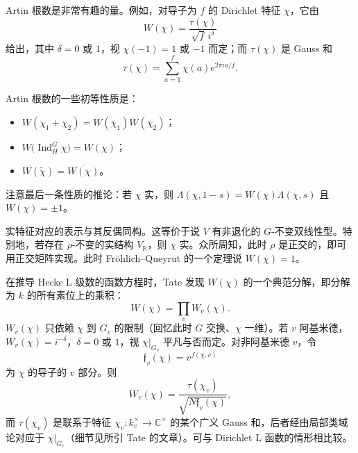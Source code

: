 Artin 根数是非常有趣的量。例如，对导子为 $f$ 的 Dirichlet 特征 $\chi$，它由
\begin{equation}\tag{6.1}\label{c4:eq:6.1}
W(\chi)=\frac{\tau(\chi)}{\sqrt{f}\,i^{\delta}}
\end{equation}
给出，其中 $\delta=0$ 或 $1$，视 $\chi(-1)=1$ 或 $-1$ 而定；而 $\tau(\chi)$ 是 Gauss 和
\begin{equation}\tag{6.2}\label{c4:eq:6.2}
\tau(\chi)=\sum_{a=1}^{f}\chi(a)e^{2\pi ia/f}.
\end{equation}

Artin 根数的一些初等性质是：
\begin{itemize}[leftmargin=2.2em,itemsep=0.2em]
\item $W(\chi_1+\chi_2)=W(\chi_1)W(\chi_2)$；
\item $W\bigl(\operatorname{Ind}^{G}_{H}\chi\bigr)=W(\chi)$；
\item $W(\tilde\chi)=\overline{W(\chi)}$。
\end{itemize}

注意最后一条性质的推论：若 $\chi$ 实，则 $\Lambda(\chi,1-s)=W(\chi)\Lambda(\chi,s)$ 且 $W(\chi)=\pm1$。

实特征对应的表示与其反偶同构。这等价于说 $V$ 有非退化的 $G$-不变双线性型。特别地，若存在 $\rho$-不变的实结构 $V_{\mathbb{R}}$，则 $\chi$ 实。众所周知，此时 $\rho$ 是正交的，即可用正交矩阵实现。此时 Fr\"ohlich--Queyrut 的一个定理说 $W(\chi)=1$。

在推导 Hecke L 级数的函数方程时，Tate 发现 $W(\chi)$ 的一个典范分解，即分解为 $k$ 的所有素位上的乘积：
\begin{equation}\tag{6.3}\label{c4:eq:6.3}
W(\chi)=\prod_{v}W_v(\chi).
\end{equation}
$W_v(\chi)$ 只依赖 $\chi$ 到 $G_v$ 的限制（回忆此时 $G$ 交换、$\chi$ 一维）。若 $v$ 阿基米德，$W_v(\chi)=i^{-\delta}$，$\delta=0$ 或 $1$，视 $\chi|_{G_v}$ 平凡与否而定。对非阿基米德 $v$，令
\begin{equation}\tag{6.4}\label{c4:eq:6.4}
\mathfrak{f}_v(\chi)=v^{f(\chi,v)}
\end{equation}
为 $\chi$ 的导子的 $v$ 部分。则
\begin{equation}\tag{6.5}\label{c4:eq:6.5}
W_v(\chi)=\frac{\tau(\chi_v)}{\sqrt{N\mathfrak{f}_v(\chi)}},
\end{equation}
而 $\tau(\chi_v)$ 是联系于特征 $\chi_v\colon k_v^{\times}\to\mathbb{C}^{\times}$ 的某个广义 Gauss 和，后者经由局部类域论对应于 $\chi|_{G_v}$（细节见所引 Tate 的文章）。可与 Dirichlet L 函数的情形相比较。

